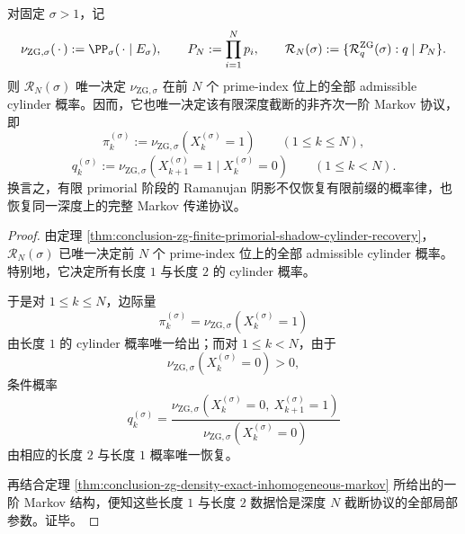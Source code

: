 \begin{theorem}\label{thm:conclusion-zg-finite-shadow-determines-truncated-markov-protocol}
对固定 \(\sigma>1\)，记
\[
\nu_{\mathrm{ZG},\sigma}(\,\cdot\,):=\PP_\sigma(\,\cdot\mid E_\sigma),
\qquad
P_N:=\prod_{i=1}^{N}p_i,
\qquad
\mathcal R_N(\sigma):=\{\mathcal R_q^{\mathrm{ZG}}(\sigma):q\mid P_N\}.
\]
则 \(\mathcal R_N(\sigma)\) 唯一决定 \(\nu_{\mathrm{ZG},\sigma}\) 在前 \(N\) 个 prime-index 位上的全部 admissible cylinder 概率。因而，它也唯一决定该有限深度截断的非齐次一阶 Markov 协议，即
\[
\pi_k^{(\sigma)}:=\nu_{\mathrm{ZG},\sigma}(X_k^{(\sigma)}=1)
\qquad (1\le k\le N),
\]
\[
q_k^{(\sigma)}:=\nu_{\mathrm{ZG},\sigma}(X_{k+1}^{(\sigma)}=1\mid X_k^{(\sigma)}=0)
\qquad (1\le k<N).
\]
换言之，有限 primorial 阶段的 Ramanujan 阴影不仅恢复有限前缀的概率律，也恢复同一深度上的完整 Markov 传递协议。
\end{theorem}
\begin{proof}
由定理 \ref{thm:conclusion-zg-finite-primorial-shadow-cylinder-recovery}，
\(\mathcal R_N(\sigma)\) 已唯一决定前 \(N\) 个 prime-index 位上的全部 admissible cylinder 概率。特别地，它决定所有长度 \(1\) 与长度 \(2\) 的 cylinder 概率。

于是对 \(1\le k\le N\)，边际量
\[
\pi_k^{(\sigma)}=\nu_{\mathrm{ZG},\sigma}(X_k^{(\sigma)}=1)
\]
由长度 \(1\) 的 cylinder 概率唯一给出；而对 \(1\le k<N\)，由于
\[
\nu_{\mathrm{ZG},\sigma}(X_k^{(\sigma)}=0)>0,
\]
条件概率
\[
q_k^{(\sigma)}
=
\frac{\nu_{\mathrm{ZG},\sigma}(X_k^{(\sigma)}=0,\ X_{k+1}^{(\sigma)}=1)}
{\nu_{\mathrm{ZG},\sigma}(X_k^{(\sigma)}=0)}
\]
由相应的长度 \(2\) 与长度 \(1\) 概率唯一恢复。

再结合定理 \ref{thm:conclusion-zg-density-exact-inhomogeneous-markov} 所给出的一阶 Markov 结构，便知这些长度 \(1\) 与长度 \(2\) 数据恰是深度 \(N\) 截断协议的全部局部参数。证毕。
\end{proof}

